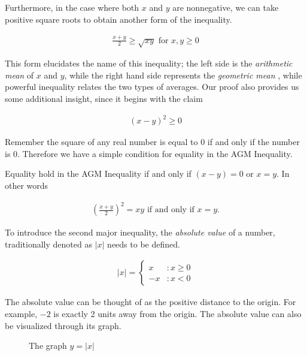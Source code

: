 \documentclass{report}
\begin{document}
Furthermore, in the case where both $x$ and $y$ are nonnegative, we can take positive square roots to obtain another form of the inequality.

\begin{align*}
	\frac{x + y}{2} \ge \sqrt{xy} \text{ for } x, y \ge 0
\end{align*}

This form elucidates the name of this inequality; the left side is the \emph{arithmetic mean} of $x$ and $y$, while the right hand side represents the \emph{geometric mean} , while powerful inequality relates the two types of averages. Our proof also provides us some additional insight, since it begins with the claim

\begin{align*}
	(x - y)^2 \ge 0
\end{align*}

Remember the square of any real number is equal to 0 if and only if the number is 0. Therefore we have a simple condition for equality in the AGM Inequality.

\vspace{\baselineskip}
\begin{theorem}
	Equality hold in the AGM Inequality if and only if $(x - y) = 0$ or $x = y$. In other words
	
	\begin{align*}
		\left( \frac{x + y}{2} \right)^2 = xy \text{ if and only if } x = y.
	\end{align*}
\end{theorem}

To introduce the second major inequality, the \emph{absolute value}  of a number, traditionally denoted as $|x|$ needs to be defined.

\begin{align*}
	|x| = \begin{cases}
		x &: x \ge 0 \\
		-x &: x < 0
	\end{cases}
\end{align*}

The absolute value can be thought of as the positive distance to the origin. For example, $-2$ is exactly 2 units away from the origin. The absolute value can also be visualized through its graph.

\begin{figure}
	\begin{center}
	\end{center}
	\caption{The graph $y = |x|$}
\end{figure}
\end{document}
